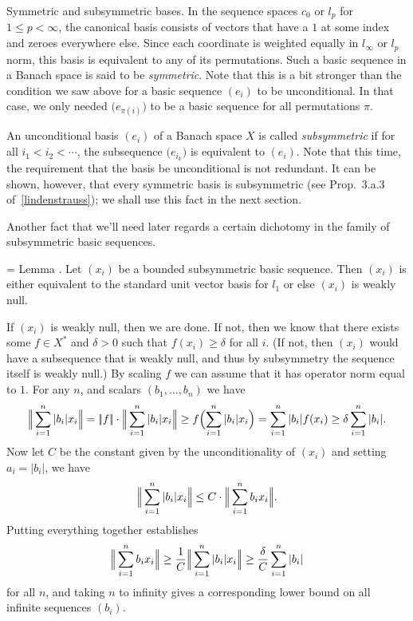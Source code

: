 \medskip\boldlabel Symmetric and subsymmetric bases. In the sequence spaces $c_0$ or $l_p$ for $1\le p<\infty$,
the canonical basis consists of vectors that have a $1$ at some index and zeroes everywhere else. Since
each coordinate is weighted equally in $l_\infty$ or $l_p$ norm, this basis is equivalent to any of its
permutations. Such a basic sequence in a Banach space is said to be {\it symmetric}. Note that
this is a bit stronger than the condition we saw above for
a basic sequence $(e_i)$ to be unconditional. In that case, we only needed $\bigl(e_{\pi(i)}\bigr)$ to be a
basic sequence for all permutations $\pi$.

An unconditional basis $(e_i)$ of a Banach space $X$ is called {\it subsymmetric} if for all $i_1<i_2<\cdots$,
the subsequence $\bigl(e_{i_k}\bigr)$ is equivalent to $(e_i)$. Note that this time, the requirement that
the basis be unconditional is not redundant. It can be shown, however, that every symmetric basis
is subsymmetric (see Prop.~3.a.3 of~\ref{lindenstrauss}); we shall use this fact in the next section.

Another fact that we'll need later regards a certain dichotomy in the family of subsymmetric basic sequences.

\newcount\dichotomy
\dichotomy=\thmcount
\proclaim Lemma \advthm. Let $(x_i)$ be a bounded subsymmetric basic sequence. Then $(x_i)$ is either equivalent
to the standard unit vector basis for $l_1$ or else $(x_i)$ is weakly null.

\proof If $(x_i)$ is weakly null, then we are done. If not, then we know that there exists some
$f\in X^*$ and $\delta>0$ such that $f(x_i) \ge \delta$ for all $i$. (If not, then $(x_i)$ would have a subsequence
that is weakly null, and thus by subsymmetry the sequence itself is weakly null.)
By scaling $f$ we can assume that it has
operator norm equal to $1$. For any $n$, and scalars $(b_1,\ldots,b_n)$ we have
$$\Big|\!\Big|\sum_{i=1}^n |b_i| x_i\Big|\!\Big| =|\!|f|\!|\cdot \Big|\!\Big|\sum_{i=1}^n |b_i| x_i\Big|\!\Big| \ge f\Bigl(\sum_{i=1}^n |b_i|x_i\Bigr)
= \sum_{i=1}^n |b_i|f(x_i)\ge \delta \sum_{i=1}^n |b_i|.$$
Now let $C$ be the constant given by the unconditionality of $(x_i)$ and setting $a_i = |b_i|$, we have
$$\Big|\!\Big|\sum_{i=1}^n |b_i|x_i\Big|\!\Big| \le C \cdot\Big|\!\Big|\sum_{i=1}^n b_ix_i\Big|\!\Big|.$$
Putting everything together establishes
$$\Big|\!\Big|\sum_{i=1}^n b_ix_i\Big|\!\Big| \ge {1\over C} \Big|\!\Big|\sum_{i=1}^n |b_i|x_i\Big|\!\Big|\ge
{\delta\over C} \sum_{i=1}^n |b_i|$$
for all $n$, and taking $n$ to infinity gives a corresponding lower bound on all infinite sequences $(b_i)$.

